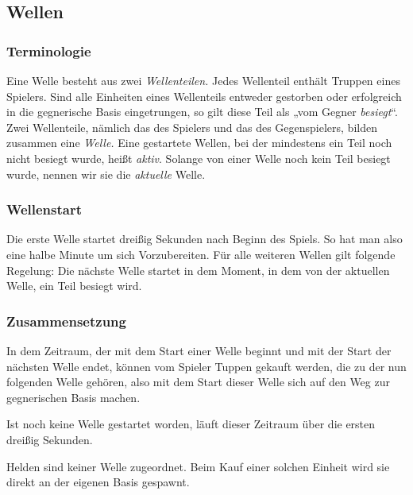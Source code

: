 \subsection{Wellen}

\subsubsection{Terminologie}

Eine Welle besteht aus zwei \emph{Wellenteilen.} Jedes Wellenteil enthält
Truppen eines Spielers.  Sind alle Einheiten eines Wellenteils entweder
gestorben oder erfolgreich in die gegnerische Basis eingetrungen, so gilt diese Teil als „vom Gegner \emph{besiegt}“.
\\
Zwei Wellenteile, nämlich das des Spielers und das des Gegenspielers, bilden
zusammen eine \emph{Welle.} Eine gestartete Wellen, bei der mindestens ein Teil
noch nicht besiegt wurde, heißt \emph{aktiv}.
Solange von einer Welle noch kein Teil besiegt wurde, nennen wir sie die \emph{aktuelle} Welle.


\subsubsection{Wellenstart}

Die erste Welle startet dreißig Sekunden nach Beginn des Spiels. So hat man also eine halbe Minute um sich Vorzubereiten.
Für alle weiteren Wellen gilt folgende Regelung: Die nächste Welle startet in dem
Moment, in dem von der aktuellen Welle, ein Teil besiegt wird.


\subsubsection{Zusammensetzung}

In dem Zeitraum, der mit dem Start einer Welle beginnt und mit der Start der
nächsten Welle endet, können vom Spieler Tuppen gekauft werden, die zu der nun
folgenden Welle gehören, also mit dem Start dieser Welle sich auf den Weg zur
gegnerischen Basis machen.

Ist noch keine Welle gestartet worden, läuft dieser Zeitraum über die ersten
dreißig Sekunden.

Helden sind keiner Welle zugeordnet. Beim Kauf einer solchen Einheit wird sie
direkt an der eigenen Basis gespawnt.
